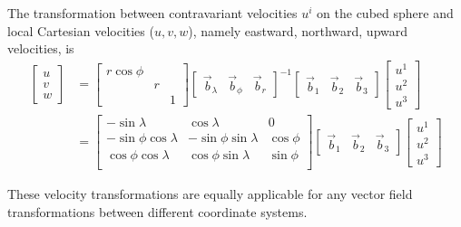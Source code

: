 \documentclass{report}
\begin{document}
The transformation between contravariant velocities $u^i$ on the cubed sphere and local Cartesian velocities ($u, v, w$), namely eastward, northward, upward velocities, is
\begin{align*}
\begin{bmatrix}
             u \\ v \\ w
        \end{bmatrix} 
        &= \begin{bmatrix}
             r\cos\phi &  &\\
              & r & \\
              &  & 1
        \end{bmatrix}
        \begin{bmatrix}
             \vec{b}_{\lambda} & \vec{b}_{\phi} & \vec{b}_{r}
        \end{bmatrix}^{-1}
        \begin{bmatrix}
             \vec{b}_{1}&  \vec{b}_{2}& \vec{b}_{3}
        \end{bmatrix}
        \begin{bmatrix}
             u^{1} \\ u^{2} \\ u^{3}
        \end{bmatrix} \\
        &= 
        \begin{bmatrix}
-\sin \lambda & \cos \lambda & 0 \\
-\sin \phi\cos\lambda & -\sin\phi\sin  \lambda & \cos \phi \\
\cos\phi\cos\lambda & \cos\phi\sin\lambda  & \sin\phi \\
\end{bmatrix}
        \begin{bmatrix}
             \vec{b}_{1}&  \vec{b}_{2}& \vec{b}_{3}
        \end{bmatrix}
        \begin{bmatrix}
             u^{1} \\ u^{2} \\ u^{3}
        \end{bmatrix}
\end{align*}

These velocity transformations are equally applicable for any vector field transformations between different coordinate systems.
\end{document}
